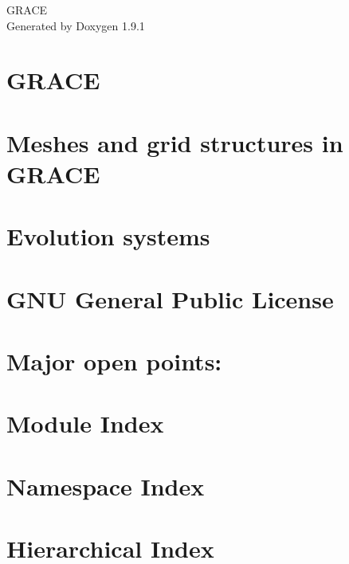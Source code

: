 \let\mypdfximage\pdfximage\def\pdfximage{\immediate\mypdfximage}\documentclass[twoside]{book}
\newcommand{\+}{\discretionary{\mbox{\scriptsize$\hookleftarrow$}}{}{}}
\newcommand{\clearemptydoublepage}{%
  \newpage{\pagestyle{empty}\cleardoublepage}%
}
\begin{document}
\raggedbottom

\hypersetup{pageanchor=false,
             bookmarksnumbered=true,
             pdfencoding=unicode
            }
\begin{titlepage}
\vspace*{7cm}
\begin{center}%
{\Large GRACE }\\
\vspace*{1cm}
{\large Generated by Doxygen 1.9.1}\\
\end{center}
\end{titlepage}
\clearemptydoublepage
{}
\tableofcontents
\clearemptydoublepage
{}
\hypersetup{pageanchor=true}

\chapter{GRACE}
\label{index}\hypertarget{index}{}
\chapter{Meshes and grid structures in GRACE}
\label{md_doc_amr}

\chapter{Evolution systems}
\label{md_doc_evol_systems_doc}

\chapter{GNU General Public License}
\label{md_LICENSE}

\chapter{Major open points\+:}
\label{md_TODO}

\chapter{Module Index}

\chapter{Namespace Index}

\chapter{Hierarchical Index}

\end{document}
